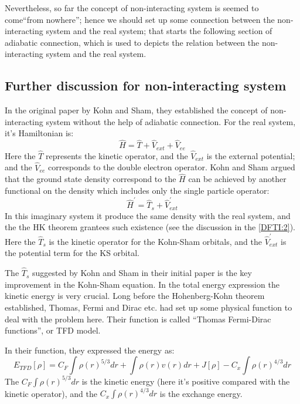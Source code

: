 Nevertheless, so far the concept of non-interacting system is seemed
to come``from nowhere''; hence we should set up some connection
between the non-interacting system and the real system; that starts
the following section of adiabatic connection, which is used to
depicts the relation between the non-interacting system and the real
system.

\subsection{Further discussion for non-interacting system}
%
%
%
In the original paper by Kohn and Sham, they established the concept
of non-interacting system without the help of adiabatic connection.
For the real system, it's Hamiltonian is:
\begin{equation}\label{}
\hat{H} = \hat{T} + \hat{V}_{ext} + \hat{V}_{ee}
\end{equation}
Here the $\hat{T}$ represents the kinetic operator, and the
$\hat{V}_{ext}$ is the external potential; and the $\hat{V}_{ee}$
corresponds to the double electron operator. Kohn and Sham argued
that the ground state density correspond to the $\hat{H}$ can be
achieved by another functional on the density which includes only
the single particle operator:
\begin{equation}\label{DFTIeq:17}
\hat{H}^{'} = \hat{T}_{s} + \hat{V}_{ext}^{'}
\end{equation}
In this imaginary system it produce the same density with the real
system, and the the HK theorem grantees such existence (see the
discussion in the \ref{DFTI:2}). Here the $\hat{T}_{s}$ is the
kinetic operator for the Kohn-Sham orbitals, and the
$\hat{V}_{ext}^{'}$ is the potential term for the KS orbital.

The $\hat{T}_{s}$ suggested by Kohn and Sham in their initial
paper\cite{HK2} is the key improvement in the Kohn-Sham equation. In
the total energy expression the kinetic energy is very crucial. Long
before the Hohenberg-Kohn theorem established, Thomas, Fermi and
Dirac etc. had set up some physical function to deal with the
problem here. Their function is called ``Thomas Fermi-Dirac
functions'', or TFD model\cite{weitaoYang, HK2}.

In their function, they expressed the energy as:
\begin{equation}\label{}
  E_{TFD}[\rho] = C_{F} \int \rho(r)^{5/3} dr + \int \rho(r)v(r)dr +
  J[\rho] - C_{x}\int \rho(r)^{4/3} dr
\end{equation}
The $C_{F} \int \rho(r)^{5/3} dr$ is the kinetic energy (here it's
positive compared with the kinetic operator), and the $C_{x}\int
\rho(r)^{4/3} dr$ is the exchange energy.

